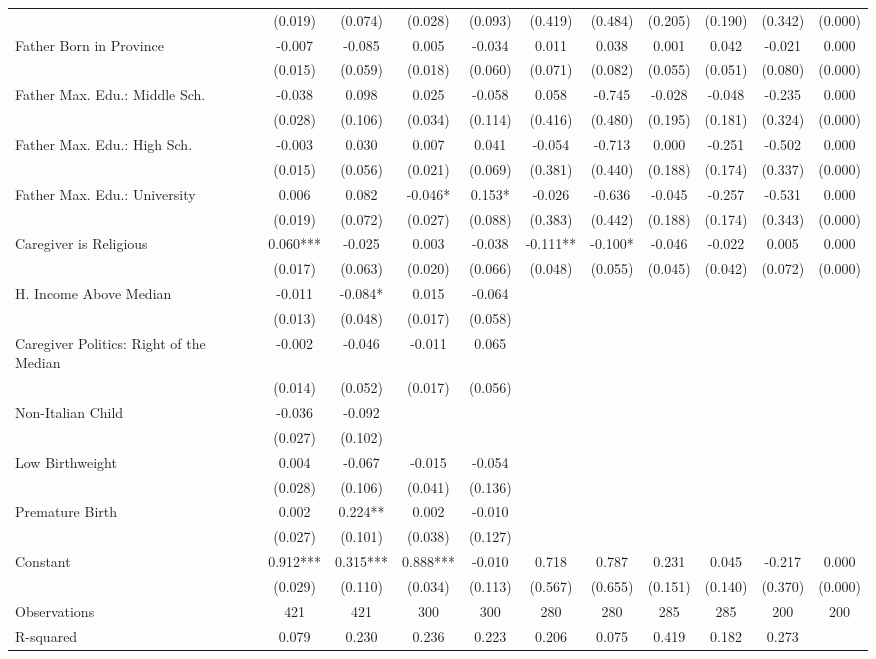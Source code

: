 \begin{tabular}{lcccccccccc}
 & (0.019) & (0.074) & (0.028) & (0.093) & (0.419) & (0.484) & (0.205) & (0.190) & (0.342) & (0.000) \\
Father Born in Province & -0.007 & -0.085 & 0.005 & -0.034 & 0.011 & 0.038 & 0.001 & 0.042 & -0.021 & 0.000 \\
 & (0.015) & (0.059) & (0.018) & (0.060) & (0.071) & (0.082) & (0.055) & (0.051) & (0.080) & (0.000) \\
Father Max. Edu.: Middle Sch. & -0.038 & 0.098 & 0.025 & -0.058 & 0.058 & -0.745 & -0.028 & -0.048 & -0.235 & 0.000 \\
 & (0.028) & (0.106) & (0.034) & (0.114) & (0.416) & (0.480) & (0.195) & (0.181) & (0.324) & (0.000) \\
Father Max. Edu.: High Sch. & -0.003 & 0.030 & 0.007 & 0.041 & -0.054 & -0.713 & 0.000 & -0.251 & -0.502 & 0.000 \\
 & (0.015) & (0.056) & (0.021) & (0.069) & (0.381) & (0.440) & (0.188) & (0.174) & (0.337) & (0.000) \\
Father Max. Edu.: University & 0.006 & 0.082 & -0.046* & 0.153* & -0.026 & -0.636 & -0.045 & -0.257 & -0.531 & 0.000 \\
 & (0.019) & (0.072) & (0.027) & (0.088) & (0.383) & (0.442) & (0.188) & (0.174) & (0.343) & (0.000) \\
Caregiver is Religious & 0.060*** & -0.025 & 0.003 & -0.038 & -0.111** & -0.100* & -0.046 & -0.022 & 0.005 & 0.000 \\
 & (0.017) & (0.063) & (0.020) & (0.066) & (0.048) & (0.055) & (0.045) & (0.042) & (0.072) & (0.000) \\
H. Income Above Median & -0.011 & -0.084* & 0.015 & -0.064 &  &  &  &  &  &  \\
 & (0.013) & (0.048) & (0.017) & (0.058) &  &  &  &  &  &  \\
Caregiver Politics: Right of the Median & -0.002 & -0.046 & -0.011 & 0.065 &  &  &  &  &  &  \\
 & (0.014) & (0.052) & (0.017) & (0.056) &  &  &  &  &  &  \\
Non-Italian Child & -0.036 & -0.092 &  &  &  &  &  &  &  &  \\
 & (0.027) & (0.102) &  &  &  &  &  &  &  &  \\
Low Birthweight & 0.004 & -0.067 & -0.015 & -0.054 &  &  &  &  &  &  \\
 & (0.028) & (0.106) & (0.041) & (0.136) &  &  &  &  &  &  \\
Premature Birth & 0.002 & 0.224** & 0.002 & -0.010 &  &  &  &  &  &  \\
 & (0.027) & (0.101) & (0.038) & (0.127) &  &  &  &  &  &  \\
Constant & 0.912*** & 0.315*** & 0.888*** & -0.010 & 0.718 & 0.787 & 0.231 & 0.045 & -0.217 & 0.000 \\
 & (0.029) & (0.110) & (0.034) & (0.113) & (0.567) & (0.655) & (0.151) & (0.140) & (0.370) & (0.000) \\
\midrule
Observations & 421 & 421 & 300 & 300 & 280 & 280 & 285 & 285 & 200 & 200 \\
 R-squared & 0.079 & 0.230 & 0.236 & 0.223 & 0.206 & 0.075 & 0.419 & 0.182 & 0.273 &  \\ \midrule
\end{tabular}
